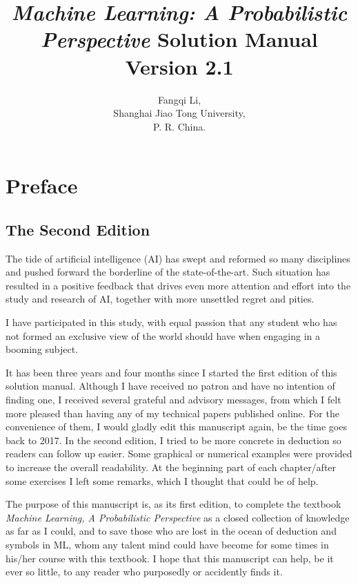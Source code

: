 \documentclass[UTF8]{ctexart}
\begin{document}
\title{\emph{Machine Learning: A Probabilistic Perspective} Solution Manual Version 2.1}
\author{Fangqi Li,\\ Shanghai Jiao Tong University,\\ P. R. China.}
\date{}
\maketitle
\tableofcontents
\newpage
\section{Preface}
\subsection{The Second Edition}
The tide of artificial intelligence (AI) has swept and reformed so many disciplines and pushed forward the borderline of the state-of-the-art.
Such situation has resulted in a positive feedback that drives even more attention and effort into the study and research of AI, together with more unsettled regret and pities.

I have participated in this study, with equal passion that any student who has not formed an exclusive view of the world should have when engaging in a booming subject.

It has been three years and four months since I started the first edition of this solution manual.
Although I have received no patron and have no intention of finding one, I received several grateful and advisory messages, from which I felt more pleased than having any of my technical papers published online.
For the convenience of them, I would gladly edit this manuscript again, be the time goes back to 2017.
In the second edition, I tried to be more concrete in deduction so readers can follow up easier.
Some graphical or numerical examples were provided to increase the overall readability.
At the beginning part of each chapter/after some exercises I left some remarks, which I thought that could be of help.

The purpose of this manuscript is, as its first edition, to complete the textbook \emph{Machine Learning, A Probabilistic Perspective} as a closed collection of knowledge as far as I could, and to save those who are lost in the ocean of deduction and symbols in ML, whom any talent mind could have become for some times in his/her course with this textbook.
I hope that this manuscript can help, be it ever so little, to any reader who purposedly or accidently finds it.
\end{document}
